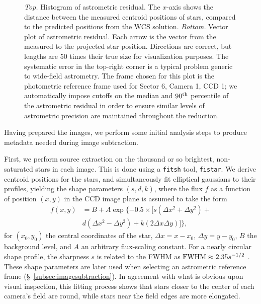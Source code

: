 \documentclass[12pt,twocolumn,tighten]{aastex62}
\begin{document}
\begin{figure}[!t]
	\vspace{-0.8cm}
	\vspace{-0.8cm}
    \caption{
		{\it Top.} Histogram of astrometric residual. The $x$-axis shows 
		the distance between the measured centroid positions of stars, 
		compared to the predicted positions from the WCS solution.
    {\it Bottom.} Vector plot of astrometric residual. Each arrow is
    the vector from the measured to the projected star position.
    Directions are correct, but lengths are 50 times their true size
    for visualization purposes.  The systematic error in the top-right
    corner is a typical problem generic to wide-field astrometry.  The
    frame chosen for this plot is the photometric reference frame used
    for Sector 6, Camera 1, CCD 1; we automatically impose cutoffs on
    the median and $90^{\rm th}$ percentile of the astrometric
    residual in order to ensure similar levels of astrometric
    precision are maintained throughout the reduction.
	}
	\label{fig:astromresid}
\end{figure}

Having prepared the images, we perform some initial analysis steps to
produce metadata needed during image subtraction.  

First, we perform source extraction on the thousand or so brightest,
non-saturated stars in each image.  This is done using a
\texttt{fitsh} tool, \texttt{fistar}.  We derive centroid positions
for the stars, and simultaneously fit elliptical gaussians to their
profiles, yielding the shape parameters $(s,d,k)$, where the flux $f$
as a function of position $(x,y)$ in the CCD image plane is assumed to
take the form
\begin{align}
  f(x,y) &= B + A \exp \{ -0.5 \times [
    s(\Delta x^2 + \Delta y^2) + \\
    \nonumber
    &d(\Delta x^2 - \Delta y^2) +
    k(2\Delta x \Delta y)
  ]  \},
\end{align}
for $(x_0,y_0)$ the central coordinates of the star, $\Delta x =
x-x_0$, $\Delta y = y - y_0$, $B$ the background level, and $A$ an
arbitrary flux-scaling constant.  For a nearly circular shape profile,
the sharpness $s$ is related to the FWHM as ${\rm FWHM} \approx
2.35s^{-1/2}$ \citep[{\it e.g.},][]{Pal_2009}.  These shape parameters
are later used when selecting an astrometric reference frame
(\S~\ref{subsec:imagesubtraction}).  In agreement with what is obvious
upon visual inspection, this fitting process shows that stars closer
to the center of each camera's field are round, while stars near the
field edges are more elongated.
\end{document}
